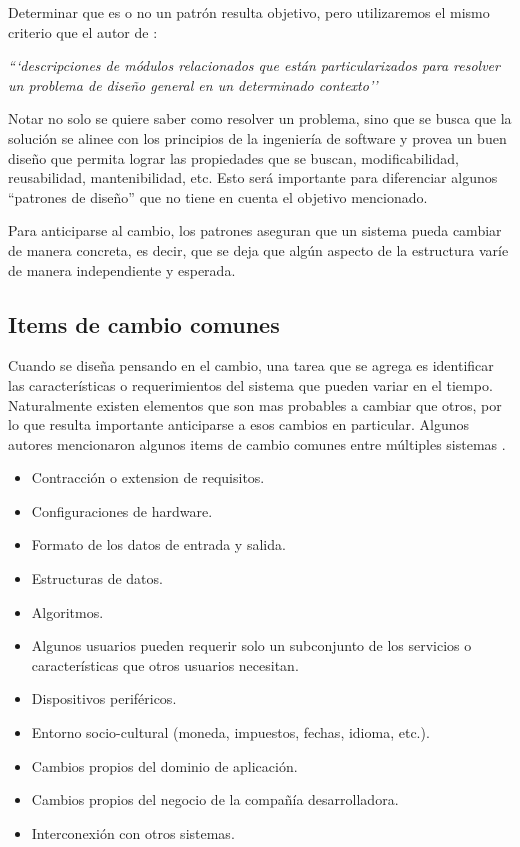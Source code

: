 Determinar que es o no un patrón resulta objetivo, pero utilizaremos el mismo criterio que el autor de \cite{Gamma:1995:DPE:186897}:

\textit{```descripciones de módulos relacionados que están particularizados para resolver un problema de diseño general en un determinado contexto''}

Notar no solo se quiere saber como resolver un problema, sino que se busca que la solución se alinee con los principios de la ingeniería de software y provea un buen diseño que permita lograr las propiedades que se buscan, modificabilidad, reusabilidad, mantenibilidad, etc. Esto será importante para diferenciar algunos ``patrones de diseño'' que no tiene en cuenta el objetivo mencionado.

Para anticiparse al cambio, los patrones aseguran que un sistema pueda cambiar de manera concreta, es decir, que se deja que algún aspecto de la estructura varíe de manera independiente y esperada.

\subsection{Items de cambio comunes}

Cuando se diseña pensando en el cambio, una tarea que se agrega es identificar las características o requerimientos del sistema que pueden variar en el tiempo. Naturalmente existen elementos que son mas probables a cambiar que otros, por lo que resulta importante anticiparse a esos cambios en particular. Algunos autores mencionaron algunos items de cambio comunes entre múltiples sistemas \cite{Parnas02}.

\begin{itemize}
	\item Contracción o extension de requisitos.
	\item Configuraciones de hardware.
	\item Formato de los datos de entrada y salida.
	\item Estructuras de datos.
	\item Algoritmos.
	\item Algunos usuarios pueden requerir solo un subconjunto de los servicios o características que otros usuarios necesitan.
	\item Dispositivos periféricos.
	\item Entorno socio-cultural (moneda, impuestos, fechas, idioma, etc.).
	\item Cambios propios del dominio de aplicación.
	\item Cambios propios del negocio de la compañía desarrolladora.
	\item Interconexión con otros sistemas.
\end{itemize}

